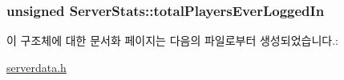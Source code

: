 \hypertarget{struct_server_stats_a18a286038d220b5de804f50e30c66f22}{
\subsubsection[{total\-Players\-Ever\-Logged\-In}]{\setlength{\rightskip}{0pt plus 5cm}unsigned Server\-Stats\-::total\-Players\-Ever\-Logged\-In}}\label{struct_server_stats_a18a286038d220b5de804f50e30c66f22}


이 구조체에 대한 문서화 페이지는 다음의 파일로부터 생성되었습니다.\-:\begin{DoxyCompactItemize}
\item 
\hyperlink{serverdata_8h}{serverdata.\-h}\end{DoxyCompactItemize}
